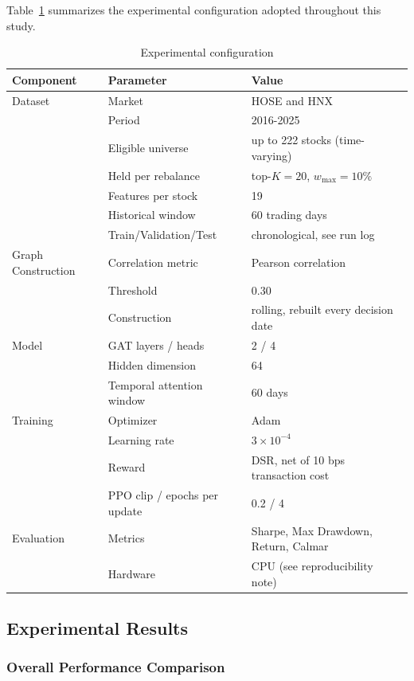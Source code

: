\documentclass[runningheads]{llncs}
\begin{document}
Table~\ref{tab:experiment_config} summarizes the experimental configuration adopted throughout this study.
\begin{table}[ht]
\centering
\caption{Experimental configuration}
\label{tab:experiment_config}
\begin{tabular}{lll}
\toprule
\textbf{Component} & \textbf{Parameter} & \textbf{Value} \\
\midrule
Dataset & Market & HOSE and HNX \\
 & Period & 2016-2025 \\
 & Eligible universe & up to 222 stocks (time-varying) \\
 & Held per rebalance & top-$K=20$, $w_{\max}=10\%$ \\
 & Features per stock & 19 \\
 & Historical window & 60 trading days \\
 & Train/Validation/Test & chronological, see run log \\
\midrule
Graph Construction & Correlation metric & Pearson correlation \\
 & Threshold & 0.30 \\
 & Construction & rolling, rebuilt every decision date \\
\midrule
Model & GAT layers / heads & 2 / 4 \\
 & Hidden dimension & 64 \\
 & Temporal attention window & 60 days \\
\midrule
Training & Optimizer & Adam \\
 & Learning rate & $3\times10^{-4}$ \\
 & Reward & DSR, net of 10 bps transaction cost \\
 & PPO clip / epochs per update & 0.2 / 4 \\
\midrule
Evaluation & Metrics & Sharpe, Max Drawdown, Return, Calmar \\
 & Hardware & CPU (see reproducibility note) \\
\bottomrule
\end{tabular}
\end{table}
\subsection{Experimental Results}

\subsubsection{Overall Performance Comparison}
\end{document}
